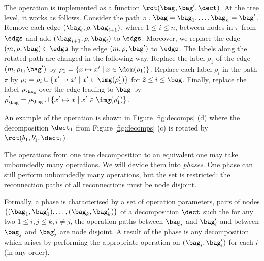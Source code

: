 {\begin{description}[leftmargin=2mm]
The operation is implemented as a function $\rot(\bag,\bag',\dect)$. At the tree level, it works as follows.
Consider the path $\pi:\bag=\bag_1,\ldots,\bag_n=\bag'$. Remove each edge $(\bag_i,\rho,\bag_{i+1})$, where $1\leq i \leq n$, between nodes in $\pi$
from $\edgs$ and add $(\bag_{i+1},\rho,\bag_i)$ to $\edgs$.
Moreover, we replace the edge $(m,\rho,\bag)\in\edgs$ by the edge $(m,\rho,\bag')$ to $\edgs$.
The labels along the rotated path are changed in the following way.
Replace the label $\rho_1$ of the edge $(m,\rho_1,\bag')$ by $\rho_1 = \{x\mapsto x'\mid x \in \dom(\rho_1)\}$.
Replace each label $\rho_i$ in the path $\pi$ by $\rho_i=\rho_i\cup \{x'\mapsto x'\mid x' \in \img(\rho_1')\}$ for $2 \leq i \leq \bag$.
Finally, replace the label $\rho_\bag$ over the edge leading to $\bag$ by $\rho_\bag'=\rho_\bag\cup\{x'\mapsto x\mid x' \in \img(\rho_1')\}$.

An example of the operation is shown in Figure \ref{fig:decomps} (d) where the decomposition $\dect_1$ from Figure \ref{fig:decomps} (c) is rotated by $\rot(b_1,b_1',\dect_1)$.

\item[Phase.]
The operations from one tree decomposition to an equivalent one may take unboundedly many operations. We will devide them into \emph{phases}.
One phase can still perform unboundedly many operations, but the set is restricted: 
the reconnection paths of all reconnections must be node disjoint.

Formally, a phase is characterised by a set of operation parameters, pairs of nodes $\{(\bag_1,\bag'_1),\ldots,(\bag_k,\bag'_k)\}$ of a decomposition $\dect$
such the for any two $1\leq i,j\leq k, i\neq j$, the operation paths between $\bag_i$ and $\bag_i'$ and between $\bag_j$ and $\bag_j'$ are node disjoint.
A result of the phase is any decomposition which arises by performing the appropriate operation on $(\bag_i,\bag_i')$ for each $i$ (in any order).


\end{description}}
